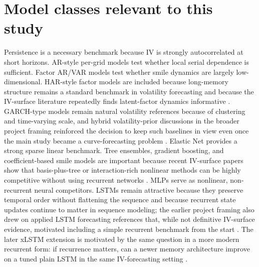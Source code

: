 \documentclass[12pt]{report}
\begin{document}
\section{Model classes relevant to this study}
Persistence is a necessary benchmark because IV is strongly autocorrelated at short horizons. AR-style per-grid models test whether local serial dependence is sufficient. Factor AR/VAR models test whether smile dynamics are largely low-dimensional. HAR-style factor models are included because long-memory structure remains a standard benchmark in volatility forecasting and because the IV-surface literature repeatedly finds latent-factor dynamics informative \citep{cont2002dynamics,kearney2019}. GARCH-type models remain natural volatility references because of clustering and time-varying scale, and hybrid volatility-prior discussions in the broader project framing reinforced the decision to keep such baselines in view even once the main study became a curve-forecasting problem \citep{zhao2024garchlstm}. Elastic Net provides a strong sparse linear benchmark. Tree ensembles, gradient boosting, and coefficient-based smile models are important because recent IV-surface papers show that basis-plus-tree or interaction-rich nonlinear methods can be highly competitive without using recurrent networks \citep{chen2024bspline,borochin2025,arratia2025}. MLPs serve as nonlinear, non-recurrent neural competitors. LSTMs remain attractive because they preserve temporal order without flattening the sequence and because recurrent state updates continue to matter in sequence modeling; the earlier project framing also drew on applied LSTM forecasting references that, while not definitive IV-surface evidence, motivated including a simple recurrent benchmark from the start \citep{sullivan2019lstm,hull2019framing}. The later xLSTM extension is motivated by the same question in a more modern recurrent form: if recurrence matters, can a newer memory architecture improve on a tuned plain LSTM in the same IV-forecasting setting \citep{beck2024xlstm}.
\end{document}
